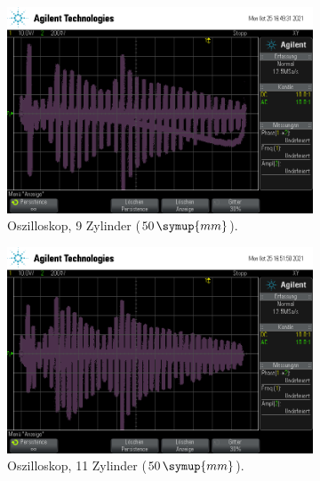 \begin{figure}
    \centering
    \begin{subfigure}[b]{0.3\textwidth}
        \centering
        \includegraphics[width=\textwidth]{data/1_1zylinder50mm/scope_9.png}
        \caption{Oszilloskop, 9 Zylinder ($50 \, \symup{mm}$).}
    \end{subfigure}
    \hfill
    \begin{subfigure}[b]{0.3\textwidth}
        \centering
        \includegraphics[width=\textwidth]{data/1_1zylinder50mm/scope_11.png}
        \caption{Oszilloskop, 11 Zylinder ($50 \, \symup{mm}$).}
    \end{subfigure}
    \hfill
    \begin{subfigure}[b]{0.3\textwidth}
        \centering

\end{subfigure}
\end{figure}
